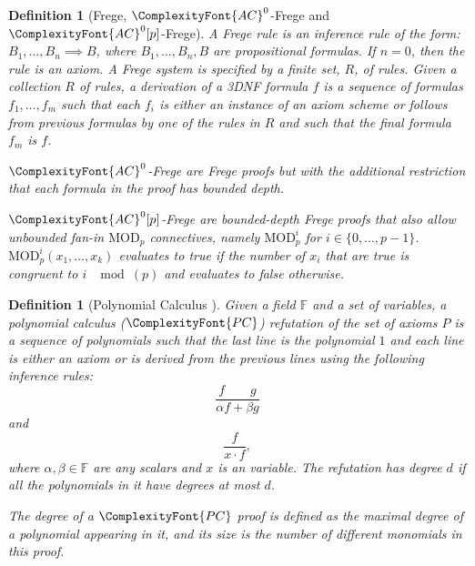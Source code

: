 \documentclass[11pt,letter]{article}
\newtheorem{definition}[theorem]{Definition}
\theoremstyle{remark} %
\newcommand{\PC}{ %
    {
        \ComplexityFont{PC}
    }
}
\newcommand{\ACZ}{\ensuremath{\ComplexityFont{AC}^0}}
\newcommand{\ACZP}{\ensuremath{\ACZ[p]}}
\begin{document}
{    
    \begin{definition}[Frege, $\ACZ$-Frege and $\ACZP$-Frege]
        \label{def: Frege, AC-Frege and ACZP-Frege}
        A \emph{Frege rule} is an inference rule of the form: $B_1, \dots, B_n \implies B$, where $B_1, \dots, B_n, B$ are propositional formulas. If $n=0$, then the rule is an axiom. A \emph{Frege system} is specified by a finite set, $R$, of rules. Given a collection $R$ of rules, a derivation of a 3DNF formula $f$ is a sequence of formulas $f_1, \dots, f_m$ such that each $f_i$ is either an instance of an axiom scheme or follows from previous formulas by one of the rules in $R$ and such that the final formula $f_m$ is $f$.

        \emph{$\ACZ$-Frege} are Frege proofs but with the additional restriction that each formula in the proof has bounded depth.

        \emph{$\ACZP$-Frege} are bounded-depth Frege proofs that also allow unbounded fan-in $\mathrm{MOD}_p$ connectives, namely $\mathrm{MOD}_p^i$ for $i \in \{0, \dots, p-1\}$. $\mathrm{MOD}_p^i(x_1,\dots, x_k)$ evaluates to true if the number of $x_i$ that are true is congruent to $i$ $\mod(p)$ and evaluates to false otherwise.
    \end{definition}


    \begin{definition}[Polynomial Calculus \cite{CEI96}]
            \label{def: polynomial calculus}
            Given a field $\mathbb{F}$ and a set of variables, a \emph{polynomial calculus} ($\PC$) refutation of the set of axioms $P$ is a sequence of polynomials such that the last line is the polynomial $1$ and each line is either an axiom or is derived from the previous lines using the following inference rules:
            \begin{equation*}
                \frac{f \qquad g}{\alpha f + \beta g}
            \end{equation*}
            and
            \begin{equation*}
                \frac{f}{x\cdot f},
            \end{equation*}
            where $\alpha, \beta \in \mathbb{F}$ are any scalars and $x$ is an variable. The refutation has degree $d$ if all the polynomials in it have degrees at most $d$.

             The \emph{degree} of a $\PC$ proof is defined as the maximal degree of a polynomial appearing in it, and its \emph{size} is the number of different \emph{monomials} in this proof.
        \end{definition}
    
}
\end{document}
